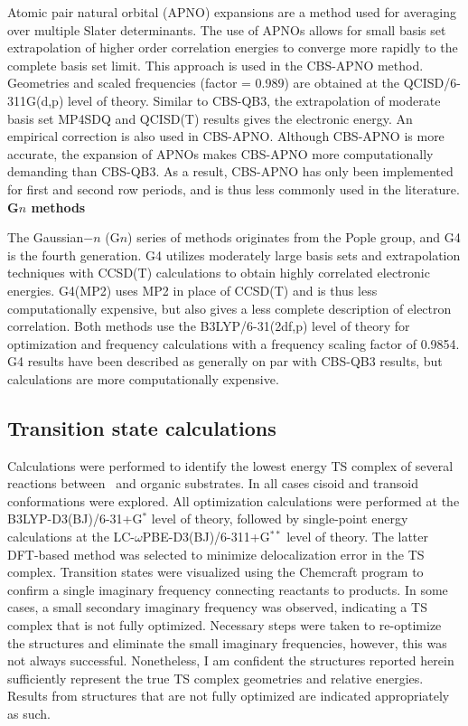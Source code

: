 Atomic pair natural orbital (APNO) expansions are a method used for averaging over multiple Slater determinants. The use of APNOs allows for small basis set extrapolation of higher order correlation energies to converge more rapidly to the complete basis set limit. This approach is used in the CBS-APNO method.\cite{Ochterski1996} Geometries and scaled frequencies (factor = 0.989) are obtained at the QCISD/6-311G(d,p) level of theory. Similar to CBS-QB3, the extrapolation of moderate basis set MP4SDQ and QCISD(T) results gives the electronic energy. An empirical correction is also used in CBS-APNO. Although CBS-APNO is more accurate, the expansion of APNOs makes CBS-APNO more computationally demanding than CBS-QB3. As a result, CBS-APNO has only been implemented for first and second row periods, and is thus less commonly used in the literature.
\\

\noindent \textbf{G$n$ methods}

The Gaussian$-n$ (G$n$) series of methods originates from the Pople group,\cite{Pople1989} and G4 is the fourth generation. G4 utilizes moderately large basis sets and extrapolation techniques with CCSD(T) calculations to obtain highly correlated electronic energies. G4(MP2) uses MP2 in place of CCSD(T) and is thus less computationally expensive, but also gives a less complete description of electron correlation. Both methods use the B3LYP/6-31(2df,p) level of theory for optimization and frequency calculations with a frequency scaling factor of 0.9854. G4 results have been described as generally on par with CBS-QB3 results,\cite{Somers2015, Simmie2015} but calculations are more computationally expensive.

\subsection{Transition state calculations}

Calculations were performed to identify the lowest energy TS complex of several reactions between \cumo\ and organic substrates. In all cases cisoid and transoid conformations were explored. All optimization calculations were performed at the B3LYP-D3(BJ)/6-31+G$^*$ level of theory, followed by single-point energy calculations at the LC-$\omega$PBE-D3(BJ)/6-311+G$^{**}$ level of theory. The latter DFT-based method was selected to minimize delocalization error in the TS complex.\cite{OterodelaRoza2014} Transition states were visualized using the Chemcraft program\cite{ccraft} to confirm a single imaginary frequency connecting reactants to products. In some cases, a small secondary imaginary frequency was observed, indicating a TS complex that is not fully optimized. Necessary steps were taken to re-optimize the structures and eliminate the small imaginary frequencies, however, this was not always successful. Nonetheless, I am confident the structures reported herein sufficiently represent the true TS complex geometries and relative energies. Results from structures that are not fully optimized are indicated appropriately as such.

